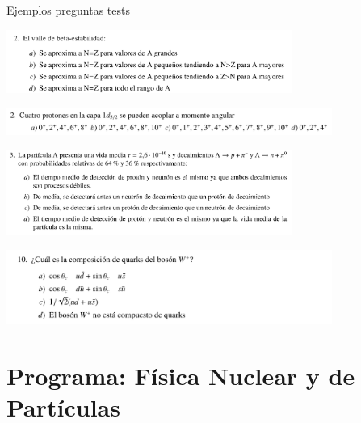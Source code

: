 \documentclass{beamer}
\begin{document}
\begin{frame}{Ejemplos preguntas tests}

\includegraphics[width=0.7\textwidth]{test1.png}

\includegraphics[width=0.8\textwidth]{test2.png}

\includegraphics[width=0.7\textwidth]{test3.png}

\includegraphics[width=0.8\textwidth]{test4.png}
\end{frame}

\section{Programa: Física Nuclear y de Partículas}
\end{document}
